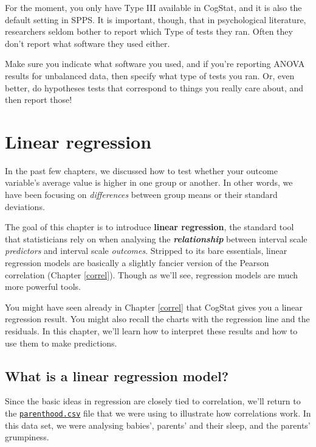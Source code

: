 \documentclass[
]{book}
\theoremstyle{definition}
\theoremstyle{definition}
\theoremstyle{definition}
\theoremstyle{definition}
\theoremstyle{remark}
\begin{document}
For the moment, you only have Type III available in CogStat, and it is also the default setting in SPPS. It is important, though, that in psychological literature, researchers seldom bother to report which Type of tests they ran. Often they don't report what software they used either.

Make sure you indicate what software you used, and if you're reporting ANOVA results for unbalanced data, then specify what type of tests you ran. Or, even better, do hypotheses tests that correspond to things you really care about, and then report those!

\hypertarget{regression}{%
\chapter{Linear regression}\label{regression}}

In the past few chapters, we discussed how to test whether your outcome variable's average value is higher in one group or another. In other words, we have been focusing on \emph{differences} between group means or their standard deviations.

The goal of this chapter is to introduce \textbf{linear regression}, the standard tool that statisticians rely on when analysing the \textbf{\emph{relationship}} between interval scale \emph{predictors} and interval scale \emph{outcomes}. Stripped to its bare essentials, linear regression models are basically a slightly fancier version of the Pearson correlation (Chapter \ref{correl}). Though as we'll see, regression models are much more powerful tools.

You might have seen already in Chapter \ref{correl} that CogStat gives you a linear regression result. You might also recall the charts with the regression line and the residuals. In this chapter, we'll learn how to interpret these results and how to use them to make predictions.

\hypertarget{introregression}{%
\section{What is a linear regression model?}\label{introregression}}

Since the basic ideas in regression are closely tied to correlation, we'll return to the \href{resources/data/parenthood.csv}{\texttt{parenthood.csv}} file that we were using to illustrate how correlations work. In this data set, we were analysing babies', parents' and their sleep, and the parents' grumpiness.
\end{document}
